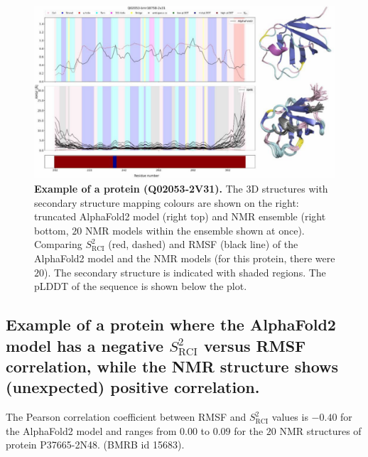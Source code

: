 \begin{figure}[H]
    \centering
    \includegraphics[width=\linewidth]{pLDDT//plddt_figures//supplementary_bhawna/supfig21.pdf}
    \caption{\textbf{Example of a protein (Q02053-2V31).} The 3D structures with secondary structure mapping colours are shown on the right: truncated AlphaFold2 model (right top) and NMR ensemble (right bottom, $20$ NMR models within the ensemble shown at once). Comparing $S_{\text{RCI}}^{2}$ (red, dashed) and RMSF (black line) of the AlphaFold2 model and the NMR models (for this protein, there were $20$). The secondary structure is indicated with shaded regions. The pLDDT of the sequence is shown below the plot.}
    \label{fig:plddt_sup:sup21}
\end{figure}

\subsection*{Example of a protein where the AlphaFold2 model has a negative $S_{\text{RCI}}^{2}$ versus RMSF correlation, while the NMR structure shows (unexpected) positive correlation.}

The Pearson correlation coefficient between RMSF and $S_{\text{RCI}}^{2}$ values is $-0.40$ for the AlphaFold2 model and ranges from $0.00$ to $0.09$ for the $20$ NMR structures of protein P37665-2N48. (BMRB id 15683).

